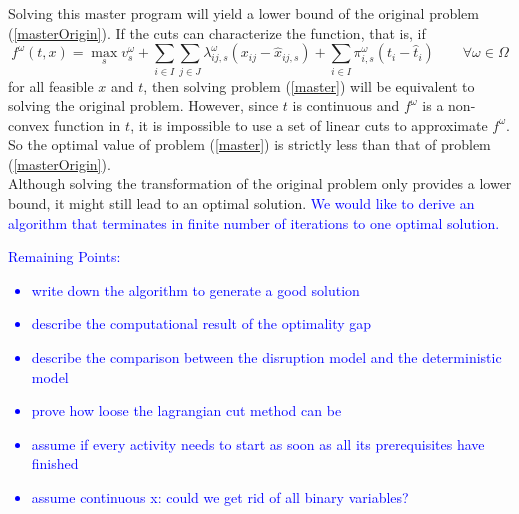 \documentclass[11pt]{article}
\begin{document}
Solving this master program will yield a lower bound of the original problem (\ref{masterOrigin}). If the cuts can characterize the function, that is, if \[f^\omega(t,x) = \max_{s} v_{s}^\omega + \sum_{i \in I}\sum_{j \in J}\lambda_{ij,s}^\omega (x_{ij} - \hat{x}_{ij,s}) + \sum_{i \in I} \pi_{i,s}^\omega(t_i - \hat{t}_i) \qquad \forall \omega \in \Omega\]
for all feasible \(x\) and \(t\), then solving problem (\ref{master}) will be equivalent to solving the original problem. However, since \(t\) is continuous and \(f^\omega\) is a non-convex function in \(t\), it is impossible to use a set of linear cuts to approximate \(f^\omega\). So the optimal value of problem (\ref{master}) is strictly less than that of problem (\ref{masterOrigin}).\\
\newline 
Although solving the transformation of the original problem only provides a lower bound, it might still lead to an optimal solution. \textcolor{blue}{We would like to derive an algorithm that terminates in finite number of iterations to one optimal solution.}\\
\textcolor{blue}{Remaining Points:
	\begin{itemize}
		\item write down the algorithm to generate a good solution
		\item describe the computational result of the optimality gap
		\item describe the comparison between the disruption model and the deterministic model
		\item prove how loose the lagrangian cut method can be
		\item assume if every activity needs to start as soon as all its prerequisites have finished
		\item assume continuous x: could we get rid of all binary variables?
	\end{itemize}
}



\end{document}
